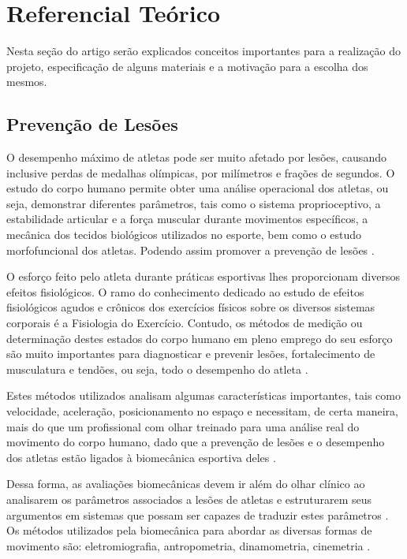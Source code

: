 
\chapter[Referencial Teórico]{Referencial Teórico}
Nesta seção do artigo serão explicados conceitos importantes para a realização do projeto, especificação de alguns materiais e a motivação para a escolha dos mesmos.  

\section{Prevenção de Lesões}

O desempenho máximo de atletas pode ser muito afetado por lesões, causando inclusive perdas de medalhas olímpicas, por milímetros e frações de segundos. O estudo do corpo humano permite obter uma análise operacional dos atletas, ou seja, demonstrar diferentes parâmetros, tais como o sistema proprioceptivo, a estabilidade articular e a força muscular durante movimentos específicos, a mecânica dos tecidos biológicos utilizados no esporte, bem como o estudo morfofuncional dos atletas. Podendo assim promover a prevenção de lesões \cite{miziara2014}.  

O esforço feito pelo atleta durante práticas esportivas lhes proporcionam diversos efeitos fisiológicos. O ramo do conhecimento dedicado ao estudo de efeitos fisiológicos agudos e crônicos dos exercícios físicos sobre os diversos sistemas corporais é a Fisiologia do Exercício. Contudo, os métodos de medição ou determinação destes estados do corpo humano em pleno emprego do seu esforço são muito importantes para diagnosticar e prevenir lesões, fortalecimento de musculatura e tendões, ou seja, todo o desempenho do atleta \cite{rocha2005}.

Estes métodos utilizados analisam algumas características importantes, tais como velocidade, aceleração, posicionamento no espaço e necessitam, de certa maneira, mais do que um profissional com olhar treinado para uma análise real do movimento do corpo humano, dado que a prevenção de lesões e o desempenho dos atletas estão ligados à biomecânica esportiva deles \cite{amadio2000}.

Dessa forma, as avaliações biomecânicas devem ir além do olhar clínico ao analisarem os parâmetros associados a lesões de atletas e estruturarem seus argumentos em sistemas que possam ser capazes de traduzir estes parâmetros \cite{miziara2014}. Os métodos utilizados pela biomecânica para abordar as diversas formas de movimento são: eletromiografia, antropometria, dinamometria, cinemetria \cite{amadio2007}.

